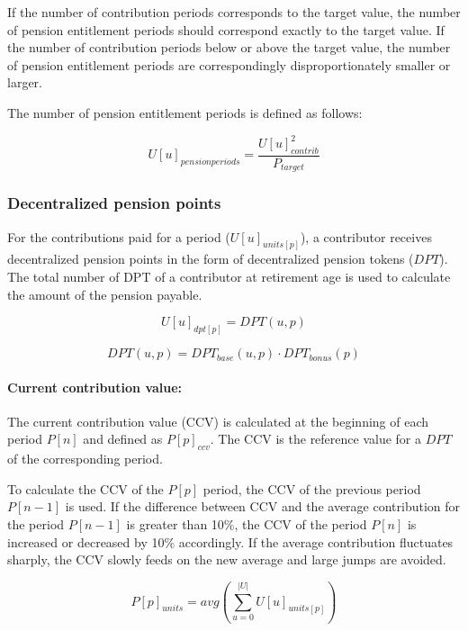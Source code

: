 If the number of contribution periods corresponds to the target value, the number of pension entitlement periods should correspond exactly to the target value. If the number of contribution periods below or above the target value, the number of pension entitlement periods are correspondingly disproportionately smaller or larger.  

The number of pension entitlement periods is defined as follows:

\begin{equation}
U[u]_{pensionperiods} = \frac{U[u]_{contrib}^2}{P_{target}}
\end{equation}


\subsubsection{Decentralized pension points}
For the contributions paid for a period ($U[u]_{units[p]}$), a contributor receives decentralized pension points in the form of decentralized pension tokens ($DPT$). The total number of DPT of a contributor at retirement age is used to calculate the amount of the pension payable.

\begin{equation}
U[u]_{dpt[p]} = DPT(u, p)
\end{equation}

\begin{equation}
DPT(u, p) = DPT_{base}(u, p) \cdot DPT_{bonus}(p)
\end{equation}

\paragraph*{Current contribution value:}
The current contribution value (CCV) is calculated at the beginning of each period $P[n]$ and defined as $P[p]_{ccv}$. The CCV is the reference value for a $DPT$ of the corresponding period.

To calculate the CCV of the $P[p]$ period, the CCV of the previous period $P[n-1]$ is used.
If the difference between CCV and the average contribution for the period $P[n-1]$ is greater than 10\%, the CCV of the period $P[n]$ is increased or decreased by 10\% accordingly.
If the average contribution fluctuates sharply, the CCV slowly feeds on the new average and large jumps are avoided.


\begin{equation}
P[p]_{units} = avg(\sum_{u=0}^{|U|} U[u]_{units[p]})
\end{equation}

